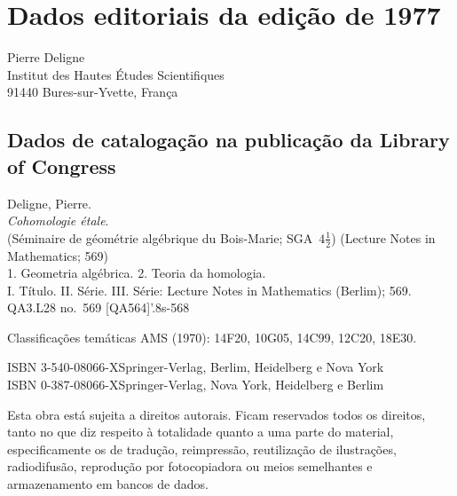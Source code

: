 
\chapter*{Dados editoriais da edição de 1977}

\begin{flushleft}
Pierre Deligne\\
Institut des Hautes Études Scientifiques\\
91440 Bures-sur-Yvette, França
\end{flushleft}

\section*{Dados de catalogação na publicação da Library of Congress}

\begin{flushleft}
Deligne, Pierre.\\
\hspace*{1em}\emph{Cohomologie étale}.\\
\hspace*{1em}(Séminaire de géométrie algébrique du Bois-Marie;
SGA~$4\frac{1}{2}$) (Lecture Notes in Mathematics; 569)\\
\hspace*{1em}1. Geometria algébrica. 2. Teoria da homologia.\\
I. Título. II. Série. III. Série: Lecture Notes in Mathematics
(Berlim); 569.\\
QA3.L28 no.~569 [QA564]'.8s\qquad [512'.33]-568
\end{flushleft}

\medskip
\noindent Classificações temáticas AMS (1970):
14F20, 10G05, 14C99, 12C20, 18E30.

\medskip
\begin{flushleft}
ISBN 3-540-08066-X\quad Springer-Verlag, Berlim, Heidelberg e Nova York\\
ISBN 0-387-08066-X\quad Springer-Verlag, Nova York, Heidelberg e Berlim
\end{flushleft}

Esta obra está sujeita a direitos autorais. Ficam reservados todos os direitos,
tanto no que diz respeito à totalidade quanto a uma parte do material,
especificamente os de tradução, reimpressão, reutilização de ilustrações,
radiodifusão, reprodução por fotocopiadora ou meios semelhantes e
armazenamento em bancos de dados.

